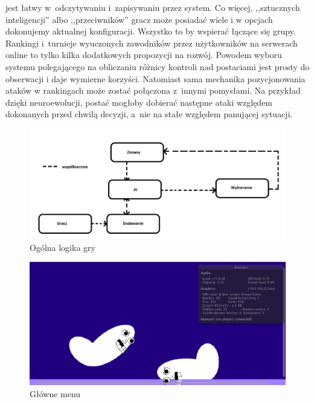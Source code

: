 \documentclass[brudnopis]{xmgr}
\begin{document}
jest łatwy w~odczytywaniu i~zapisywaniu przez system. Co więcej,
 ,,sztucznych inteligencji'' albo ,,przeciwników'' gracz może posiadać wiele i
w opcjach dokonujemy aktualnej konfiguracji. Wszystko to by wspierać
łączące się grupy.
Rankingi i~turnieje wyuczonych zawodników przez użytkowników na serwerach
online to tylko kilka dodatkowych propozycji na rozwój.
Powodem wyboru systemu polegającego na obliczaniu różnicy kontroli nad
postaciami jest prosty do obserwacji i
daje wymierne korzyści. Natomiast sama mechanika pozycjonowania ataków w
rankingach może zostać połączona z~innymi pomysłami. Na przykład dzięki
neuroewolucji, postać mogłoby dobierać następne ataki względem dokonanych
przed chwilą decyzji, a~nie na stałe względem panującej sytuacji.
\begin{figure}[!tbh]
\centering
\includegraphics[width=0.7\hsize]{fig/echoFlow}
\caption{Ogólna logika gry\label{RYS.3}}
\end{figure}

\begin{figure}[!tbh]
\centering
\includegraphics[width=0.7\hsize]{fig/knocked}
\caption{Główne menu\label{RYS.4}}
\end{figure}
\end{document}
